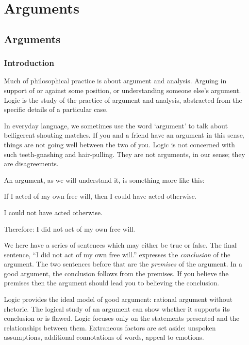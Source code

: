 \part{Arguments}
\label{ch.intro}


\chapter{Arguments}
\label{s:Arguments}
\section{Introduction}
Much of philosophical practice is about argument and
analysis. 
Arguing in support of or against some position, or understanding someone else's argument. 
Logic is the study of the practice of argument and
analysis, abstracted from the specific details of a
particular case.



In everyday language, we sometimes use the word `argument' to talk about belligerent shouting matches.  If you and a friend have an argument in this sense, things are not going well between the two of you. Logic is not concerned with such teeth-gnashing and hair-pulling. They are not arguments, in our sense; they are disagreements.

An argument, as we will understand it, is something more like this:
		\begin{ebullet}
	\item If I acted of my own free will, then I could have acted otherwise.
	\item I could not have acted otherwise. 
	\item Therefore: I did not act of my own free will. 
		\end{ebullet}
We here have a series of sentences which may either be true or false. The final sentence, ``I did not act of my own free will.'' expresses the \emph{conclusion} of the argument. The two sentences before that are the \emph{premises} of the argument. In a good argument, the conclusion follows from the premises. If you believe the premises then the argument should lead you to believing the conclusion.

Logic provides the ideal model of good argument:
rational argument without rhetoric.
The logical study of an argument can show whether it
supports its conclusion or is flawed.
Logic focuses only on the statements presented and the
relationships between them.
Extraneous factors are set aside: unspoken assumptions,
additional connotations of words, appeal to emotions.

